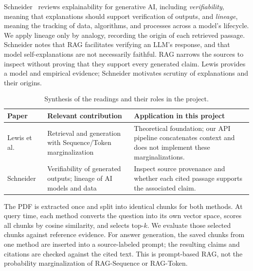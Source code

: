 \documentclass[12pt,a4paper]{article}
\begin{document}
Schneider~\cite{schneider} reviews explainability for generative AI, including \textit{verifiability}, meaning that explanations should support verification of outputs, and \textit{lineage}, meaning the tracking of data, algorithms, and processes across a model's lifecycle. We apply lineage only by analogy, recording the origin of each retrieved passage. Schneider notes that RAG facilitates verifying an LLM's response, and that model self-explanations are not necessarily faithful. RAG narrows the sources to inspect without proving that they support every generated claim. Lewis provides a model and empirical evidence; Schneider motivates scrutiny of explanations and their origins.

\begin{table}[H]\centering\small
\begin{tabularx}{\linewidth}{p{2.5cm}XX}\toprule
Paper & Relevant contribution & Application in this project\\\midrule
Lewis et al.~\cite{lewis} & Retrieval and generation with Sequence/Token marginalization & Theoretical foundation; our API pipeline concatenates context and does not implement these marginalizations.\\
Schneider~\cite{schneider} & Verifiability of generated outputs; lineage of AI models and data & Inspect source provenance and whether each cited passage supports the associated claim.\\\bottomrule
\end{tabularx}
\caption{Synthesis of the readings and their roles in the project.}
\end{table}

The PDF is extracted once and split into identical chunks for both methods. At query time, each method converts the question into its own vector space, scores all chunks by cosine similarity, and selects top-$k$. We evaluate those selected chunks against reference evidence. For answer generation, the saved chunks from one method are inserted into a source-labeled prompt; the resulting claims and citations are checked against the cited text. This is prompt-based RAG, not the probability marginalization of RAG-Sequence or RAG-Token.
\end{document}
